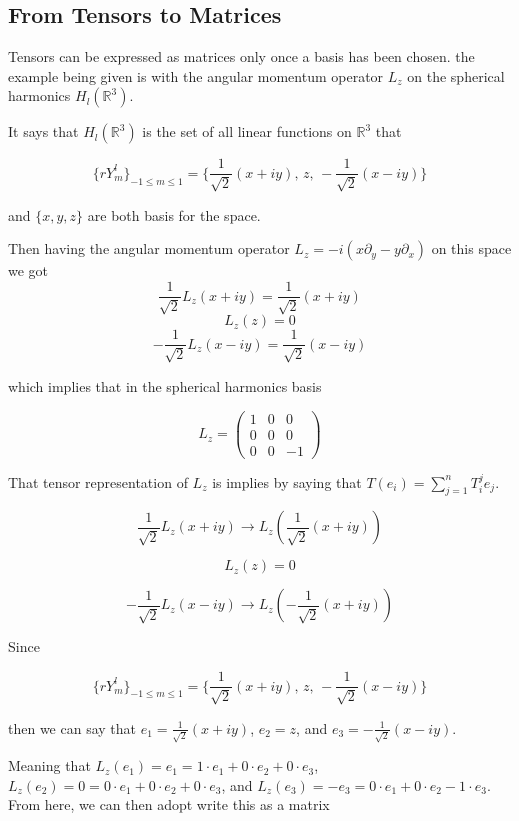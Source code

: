 \subsection{From Tensors to Matrices}

Tensors can be expressed as matrices only once a basis has been chosen.
the example being given is with the angular momentum operator $L_z$ on the spherical harmonics $H_l (\mathbb{R}^3)$.

It says that $H_l (\mathbb{R}^3)$ is the set of all linear functions on $\mathbb{R}^3$ that

$$
\{ r Y_{m}^{l} \}_{ -1 \leq m \leq 1 } =
\Big\{ \frac{1}{\sqrt{2}} (x +iy), \, z, \, - \frac{1}{\sqrt{2}} (x -iy) \Big\}
$$

and $\{ x, y, z \}$ are both basis for the space.

Then having the angular momentum operator $L_z = -i ( x\partial_y - y \partial_x )$ on this space we got
$$
\frac{1}{\sqrt{2}} L_z (x + iy) = \frac{1}{\sqrt{2}} (x + iy)
$$
$$
L_z (z) = 0
$$
$$
-\frac{1}{\sqrt{2}} L_z (x -iy) = \frac{1}{\sqrt{2}} (x -iy)
$$

which implies that in the spherical harmonics basis

$$
L_z = 
\begin{pmatrix}
1 & 0 & 0 \\
0 & 0 & 0 \\
0 & 0 & -1
\end{pmatrix}
$$

That tensor representation of $L_z$ is implies by saying that
$T(e_i) = \sum^{n}_{j=1} T_{i}^{j} e_j$.


$$
\frac{1}{\sqrt{2}} L_z (x + iy)
\rightarrow
L_z \left( \frac{1}{\sqrt{2}} (x + iy) \right)
$$

$$
L_z (z) = 0
$$

$$
-\frac{1}{\sqrt{2}} L_z (x -iy)
\rightarrow
L_z \left( -\frac{1}{\sqrt{2}} (x + iy) \right)
$$

Since

$$
\{ r Y_{m}^{l} \}_{ -1 \leq m \leq 1 } =
\Big\{ \frac{1}{\sqrt{2}} (x +iy), \, z, \, - \frac{1}{\sqrt{2}} (x -iy) \Big\}
$$

then we can say that $e_1 = \frac{1}{\sqrt{2}} (x +iy)$, $e_2 = z$, and $e_3 = -\frac{1}{\sqrt{2}} (x -iy)$.

Meaning that $L_z (e_1) = e_1 = 1\cdot e_1 + 0\cdot e_2 + 0\cdot e_3$,
$L_z (e_2) = 0 = 0\cdot e_1 + 0\cdot e_2 + 0\cdot e_3$, and
$L_z (e_3) = -e_3 = 0\cdot e_1 + 0\cdot e_2 - 1\cdot e_3$.
From here, we can then adopt write this as a matrix

